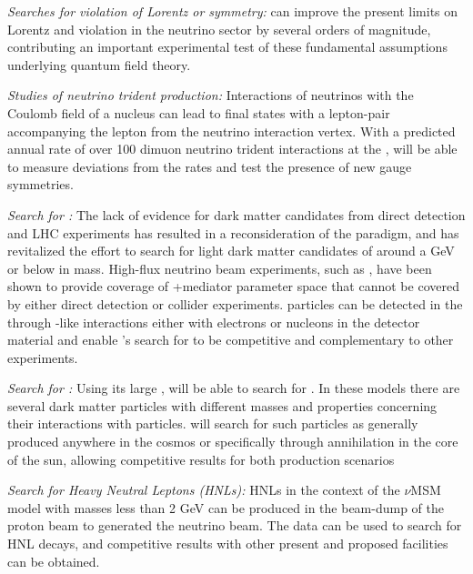 \textit{Searches for violation of Lorentz or  symmetry:}   can improve the present limits on Lorentz and  violation in the neutrino sector by several orders of magnitude, contributing an important experimental test of these fundamental assumptions underlying quantum field theory.

\textit{Studies of neutrino trident production:}  
Interactions of neutrinos with the Coulomb field of a 
nucleus can lead to final states with a lepton-pair 
accompanying the lepton from the neutrino interaction 
vertex. 
With a predicted annual rate of over 100 dimuon 
neutrino trident interactions at the ,  will be 
able to measure deviations from the  rates and test 
the presence of new gauge symmetries.

\textit{Search for :}  The lack of evidence for  dark matter 
candidates from direct detection and LHC experiments has resulted in a reconsideration of the  paradigm, and has revitalized the effort to search for light dark matter candidates 
of around a GeV or below in mass. High-flux neutrino beam experiments, such as , have been shown to provide coverage of +mediator parameter space that cannot be covered by either direct detection or collider experiments.  particles can be detected in the  through -like interactions either with electrons or nucleons in the detector material and enable 's search for  to be competitive and complementary to other experiments.

\textit{Search for :} Using its large ,  will be able to search for  . In these models there are several dark matter particles with different masses and
properties concerning their interactions with  particles.  will search for such particles 
as generally produced anywhere in the cosmos or specifically through annihilation 
in the core of the sun, allowing competitive results for both production scenarios

\textit{Search for Heavy Neutral Leptons (HNLs):} HNLs in the context of the $\nu$MSM model with 
masses less than 2 GeV can be produced in the beam-dump of the proton beam to generated the 
 neutrino beam. The  data can be used to search for HNL decays, and competitive
results with other present and proposed facilities can be obtained.

